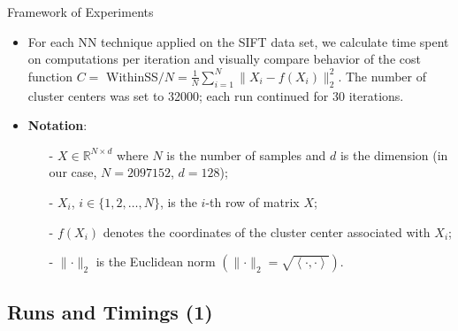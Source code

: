 \begin{frame}
	
	
	\begin{block}{Framework of Experiments}
		
		\begin{itemize}
			
			\item 	For each NN technique applied on the SIFT data set, we calculate time spent on computations per iteration and visually compare behavior of the cost function $C=$ WithinSS$/ N = \frac{1}{N}\sum_{i = 1}^{N} \lVert X_{i} - f(X_{i})\rVert_{2}^{2}$. The number of cluster centers was set to 32000; each run continued for 30 iterations.
			
			\item \textbf{Notation}:
			
			\begin{itemize}
				\item[-] $X \in \mathbb{R}^{N \times d}$ where $N$ is the number of samples and $d$ is the dimension (in our case, $N = 2097152$, $d = 128$);
				\item[-] $X_{i}$, $i \in \{1, 2, \dots, N\}$, is the $i$-th row of matrix $X$;
				\item[-] $f(X_{i})$ denotes the coordinates of the cluster center associated with $X_{i}$;
				\item[-] $\lVert \cdot \rVert_{2}$ is the Euclidean norm $\left( \lVert \cdot \rVert_{2} = \sqrt{\left< \cdot, \cdot \right>} \right)$.
			\end{itemize}	
		\end{itemize}
		
	\end{block}
	
\end{frame}


\subsection{Runs and Timings (1)}

